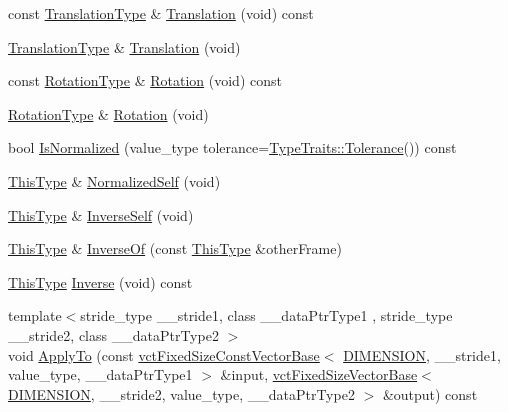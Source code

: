 \begin{DoxyCompactItemize}
\item 
const \hyperlink{classvct_frame_base_a4c397a93b65f0c38e75e99ff3a659c23}{Translation\+Type} \& \hyperlink{classvct_frame_base_a56ec390e951c631d38c32241687a3f21}{Translation} (void) const 
\item 
\hyperlink{classvct_frame_base_a4c397a93b65f0c38e75e99ff3a659c23}{Translation\+Type} \& \hyperlink{classvct_frame_base_a06304d635d0c75472a16fdf3b7791083}{Translation} (void)
\item 
const \hyperlink{classvct_frame_base_a02e4eaad478400dd1d81e772caf3b01b}{Rotation\+Type} \& \hyperlink{classvct_frame_base_a227f550b0ef97f4894432dcdfd001868}{Rotation} (void) const 
\item 
\hyperlink{classvct_frame_base_a02e4eaad478400dd1d81e772caf3b01b}{Rotation\+Type} \& \hyperlink{classvct_frame_base_ad7d5e4d840285bcff027421c2ec458fe}{Rotation} (void)
\item 
bool \hyperlink{classvct_frame_base_a6e14357724f75d4bc7a60631028b23c1}{Is\+Normalized} (value\+\_\+type tolerance=\hyperlink{classcmn_type_traits_adc129bf9867295b90d300768b780fa99}{Type\+Traits\+::\+Tolerance}()) const 
\item 
\hyperlink{classvct_frame_base_a076f1fe4fc957faa0d1ff7450d1cb768}{This\+Type} \& \hyperlink{classvct_frame_base_ac7b9a5588944d681cd48193749cdd6d3}{Normalized\+Self} (void)
\item 
\hyperlink{classvct_frame_base_a076f1fe4fc957faa0d1ff7450d1cb768}{This\+Type} \& \hyperlink{classvct_frame_base_aec5d08a21958fe3ef38f700ea3ff7997}{Inverse\+Self} (void)
\item 
\hyperlink{classvct_frame_base_a076f1fe4fc957faa0d1ff7450d1cb768}{This\+Type} \& \hyperlink{classvct_frame_base_abd9f3211a54590d58a5d5d4a520de833}{Inverse\+Of} (const \hyperlink{classvct_frame_base_a076f1fe4fc957faa0d1ff7450d1cb768}{This\+Type} \&other\+Frame)
\item 
\hyperlink{classvct_frame_base_a076f1fe4fc957faa0d1ff7450d1cb768}{This\+Type} \hyperlink{classvct_frame_base_a2bc4ed6a64789bc0ee3860bc22605c1a}{Inverse} (void) const 
\item 
{\footnotesize template$<$stride\+\_\+type \+\_\+\+\_\+stride1, class \+\_\+\+\_\+data\+Ptr\+Type1 , stride\+\_\+type \+\_\+\+\_\+stride2, class \+\_\+\+\_\+data\+Ptr\+Type2 $>$ }\\void \hyperlink{classvct_frame_base_a4c6f380960a15eeb88d24f345c28eed3}{Apply\+To} (const \hyperlink{classvct_fixed_size_const_vector_base}{vct\+Fixed\+Size\+Const\+Vector\+Base}$<$ \hyperlink{classvct_frame_base_a4284a4e875533c13df90a20c0233e043ad25b85efd5e4c2687ddf38ae18cd88f0}{D\+I\+M\+E\+N\+S\+I\+O\+N}, \+\_\+\+\_\+stride1, value\+\_\+type, \+\_\+\+\_\+data\+Ptr\+Type1 $>$ \&input, \hyperlink{classvct_fixed_size_vector_base}{vct\+Fixed\+Size\+Vector\+Base}$<$ \hyperlink{classvct_frame_base_a4284a4e875533c13df90a20c0233e043ad25b85efd5e4c2687ddf38ae18cd88f0}{D\+I\+M\+E\+N\+S\+I\+O\+N}, \+\_\+\+\_\+stride2, value\+\_\+type, \+\_\+\+\_\+data\+Ptr\+Type2 $>$ \&output) const 

\end{DoxyCompactItemize}
